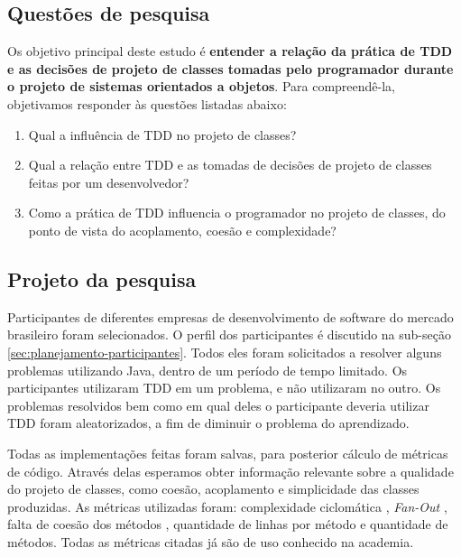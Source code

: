 \documentclass[conference]{IEEEtran}
\begin{document}
\subsection{Questões de pesquisa}

Os objetivo principal deste estudo é \textbf{entender a relação da prática de TDD 
e as decisões de projeto de classes tomadas pelo programador durante o 
projeto de sistemas orientados a objetos}.
Para compreendê-la, objetivamos responder às questões listadas
abaixo:

\begin{enumerate}

	\item Qual a influência de TDD no projeto de classes?

	\item Qual a relação entre TDD e as tomadas de decisões de projeto de classes
	feitas por um desenvolvedor?

	\item Como a prática de TDD influencia o programador no 
	projeto de classes, do ponto de vista do acoplamento, coesão e complexidade?

\end{enumerate}

\subsection{Projeto da pesquisa}

Participantes de diferentes empresas de desenvolvimento de software do mercado
brasileiro foram selecionados. O perfil dos participantes é 
discutido na sub-seção \ref{sec:planejamento-participantes}. 
Todos eles foram solicitados a resolver 
alguns problemas utilizando Java, dentro de um período de tempo limitado. 
Os participantes utilizaram TDD em um problema, e não utilizaram
no outro. Os problemas resolvidos bem como em qual deles o participante
deveria utilizar TDD foram aleatorizados, a fim de diminuir o problema do aprendizado.

Todas as implementações feitas foram salvas, para posterior
cálculo de métricas de código. 
Através delas esperamos obter
informação relevante sobre a qualidade do projeto de classes, como coesão, acoplamento
e simplicidade das classes produzidas.
As métricas utilizadas foram: complexidade ciclomática \cite{mccabe}, \textit{Fan-Out} \cite{lorenz},
falta de coesão dos métodos \cite{lcom-hs}, quantidade de linhas por método e quantidade de métodos.
Todas as métricas citadas já são de uso conhecido na academia.
\end{document}
